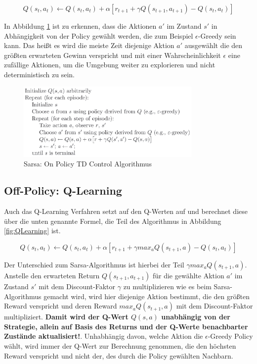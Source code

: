 \documentclass[10pt]{scrartcl}
\begin{document}
\begin{equation}
Q(s_{t},a_{t}) \leftarrow Q(s_{t},a_{t}) + \alpha [r_{t+1} + \gamma Q(s_{t+1},a_{t+1}) - Q(s_{t},a_{t})]
\end{equation}

In Abbildung \ref{fig:Sarsa} ist zu erkennen, dass die Aktionen $a'$ im Zustand $s'$ in Abhängigkeit von der Policy gewählt werden, die zum Beispiel $\epsilon$-Greedy sein kann. Das heißt es wird die meiste Zeit diejenige Aktion $a'$ ausgewählt die den größten erwarteten Gewinn verspricht und mit einer Wahrscheinlichkeit $\epsilon$ eine zufällige Aktionen, um die Umgebung weiter zu explorieren und nicht deterministisch zu sein.

\begin{figure}[htbp]
	\centering	\includegraphics[width=0.8\textwidth]{Bilder/Sarsa.png}
	\caption{Sarsa: On Policy TD Control Algorithmus}
	\label{fig:Sarsa}
\end{figure}


\subsection{Off-Policy: Q-Learning}
Auch das Q-Learning Verfahren setzt auf den Q-Werten auf und berechnet diese über die unten genannte Formel, die Teil des Algorithmus in Abbildung \ref{fig:QLearning} ist.

\begin{equation}
Q(s_{t},a_{t}) \leftarrow Q(s_{t},a_{t}) + \alpha [r_{t+1} + \gamma max_{a} Q(s_{t+1},a) - Q(s_{t},a_{t})]
\end{equation} 

Der Unterschied zum Sarsa-Algorithmus ist hierbei der Teil $\gamma max_{a} Q(s_{t+1},a)$. Anstelle den erwarteten Return $Q(s_{t+1},a_{t+1})$ für die gewählte Aktion $a'$ im Zustand $s'$ mit dem Discount-Faktor $\gamma$ zu multiplizieren wie es beim Sarsa-Algorithmus gemacht wird, wird hier diejenige Aktion bestimmt, die den größten Reward verspricht und deren Reward $max_{a} Q(s_{t+1},a)$ mit dem Discount-Faktor multipliziert. \textbf{Damit wird der Q-Wert $Q(s,a)$ unabhängig von der Strategie, allein auf Basis des Returns und der Q-Werte benachbarter Zustände aktualisiert!}. 
Unhabhängig davon, welche Aktion die $\epsilon$-Greedy Policy wählt, wird immer der Q-Wert zur Berechnung genommen, die den höchsten Reward verspricht und nicht der, des durch die Policy gewählten Nachbarn. 
\end{document}
